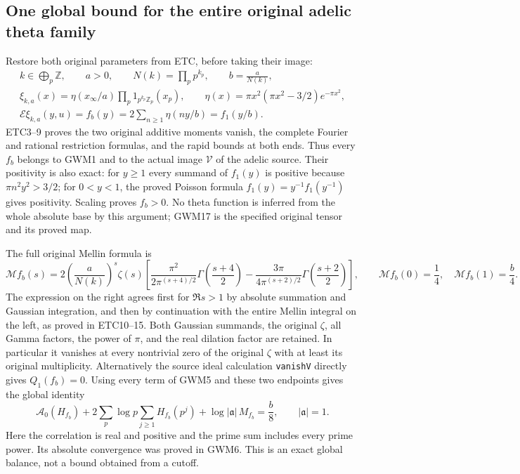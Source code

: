 \subsection{One global bound for the entire original adelic theta family}

Restore both original parameters from ETC, before taking their image:
\begin{equation}\tag{GWM17}
 \begin{gathered}
 k\in\bigoplus_p\mathbb Z,\qquad a>0,\qquad
 N(k)=\prod_p p^{k_p},\qquad b=\frac a{N(k)},\\
 \xi_{k,a}(x)=\eta(x_\infty/a)\prod_p1_{p^{k_p}\mathbb Z_p}(x_p),\qquad
 \eta(x)=\pi x^2(\pi x^2-3/2)e^{-\pi x^2},\\
 \mathcal E\xi_{k,a}(y,u)=f_b(y)
      =2\sum_{n\ge1}\eta(ny/b)=f_1(y/b).
 \end{gathered}
\end{equation}
ETC3--9 proves the two original additive moments vanish, the complete
Fourier and rational restriction formulas, and the rapid bounds at both
ends. Thus every $f_b$ belongs to GWM1 and to the actual image
$\mathcal V$ of the adelic source. Their positivity is also exact:
for $y\ge1$ every summand of $f_1(y)$ is positive because
$\pi n^2y^2>3/2$; for $0<y<1$, the proved Poisson formula
$f_1(y)=y^{-1}f_1(y^{-1})$ gives positivity. Scaling proves $f_b>0$.
No theta function is inferred from the whole absolute base by this
argument; GWM17 is the specified original tensor and its proved map.

The full original Mellin formula is
\begin{equation}\tag{GWM18}
 \mathcal M f_b(s)=2\left(\frac a{N(k)}\right)^s\zeta(s)\left[
 \frac{\pi^2}{2\pi^{(s+4)/2}}\Gamma\left(\frac{s+4}{2}\right)
 -\frac{3\pi}{4\pi^{(s+2)/2}}\Gamma\left(\frac{s+2}{2}\right)\right],\qquad
 \mathcal M f_b(0)=\frac14,\quad\mathcal M f_b(1)=\frac b4.
\end{equation}
The expression on the right agrees first for $\Re s>1$ by absolute
summation and Gaussian integration, and then by continuation with the
entire Mellin integral on the left, as proved in ETC10--15. Both
Gaussian summands, the original $\zeta$, all Gamma factors, the power
of $\pi$, and the real dilation factor are retained. In particular
it vanishes at every nontrivial zero of the original $\zeta$ with
at least its original multiplicity. Alternatively the source ideal
calculation \texttt{vanishV} directly gives $Q_1(f_b)=0$.
Using every term of GWM5 and these two endpoints gives the global identity
\begin{equation}\tag{GWM19}
 \mathcal A_0(H_{f_b})+
 2\sum_p\log p\sum_{j\ge1}H_{f_b}(p^j)
 +\log|\mathfrak a|\,M_{f_b}
 =\frac b8,\qquad |\mathfrak a|=1.
\end{equation}
Here the correlation is real and positive and the prime sum includes
every prime power. Its absolute convergence was proved in GWM6.
This is an exact global balance, not a bound obtained from a cutoff.

